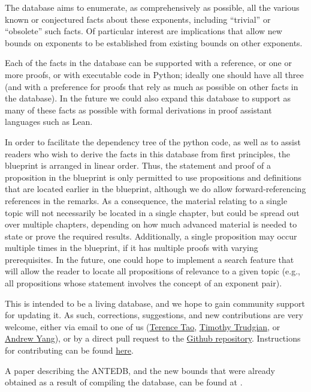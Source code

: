 The database aims to enumerate, as comprehensively as possible, all the various known or conjectured facts about these exponents, including ``trivial'' or ``obsolete'' such facts.  Of particular interest are implications that allow new bounds on exponents to be established from existing bounds on other exponents.

Each of the facts in the database can be supported with a reference, or one or more proofs, or with executable code in Python; ideally one should have all three (and with a preference for proofs that rely as much as possible on other facts in the database).  In the future we could also expand this database to support as many of these facts as possible with formal derivations in proof assistant languages such as Lean.

In order to facilitate the dependency tree of the python code, as well as to assist readers who wish to derive the facts in this database from first principles, the blueprint is arranged in linear order.  Thus, the statement and proof of a proposition in the blueprint is only permitted to use propositions and definitions that are located earlier in the blueprint, although we do allow forward-referencing references in the remarks.  As a consequence, the material relating to a single topic will not necessarily be located in a single chapter, but could be spread out over multiple chapters, depending on how much advanced material is needed to state or prove the required results.  Additionally, a single proposition may occur multiple times in the blueprint, if it has multiple proofs with varying prerequisites.  In the future, one could hope to implement a search feature that will allow the reader to locate all propositions of relevance to a given topic (e.g., all propositions whose statement involves the concept of an exponent pair).

This is intended to be a living database, and we hope to gain community support for updating it.  As such, corrections, suggestions, and new contributions are very welcome, either via email to one of us (\href{mailto:tao@math.ucla.edu}{Terence Tao}, \href{mailto:timothy.trudgian@unsw.edu.au}{Timothy Trudgian}, or \href{mailto:andrew.yang1@unsw.edu.au}{Andrew Yang}), or by a direct pull request to the \href{https://github.com/teorth/expdb}{Github repository}.  Instructions for contributing can be found \href{https://github.com/teorth/expdb/blob/main/CONTRIBUTING.md}{here}.

A paper describing the ANTEDB, and the new bounds that were already obtained as a result of compiling the database, can be found at \cite{tao-trudgian-yang}.
